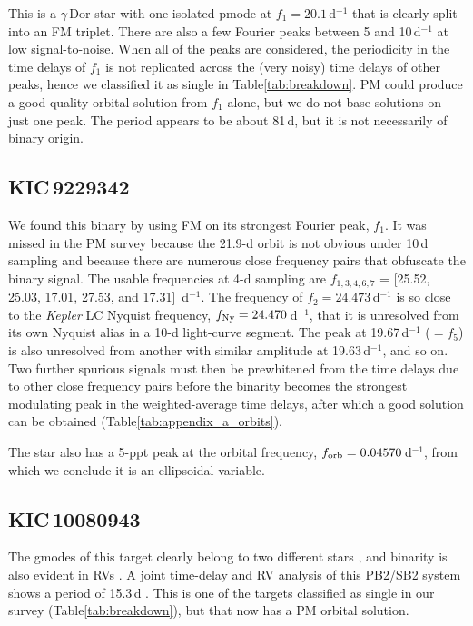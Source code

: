 \documentclass[a4paper,fleqn,usenatbib]{mnras}
\begin{document}
This is a $\gamma$\,Dor star with one isolated p\:mode at $f_1=20.1$\,d$^{-1}$ that is clearly split into an FM triplet. There are also a few Fourier peaks between 5 and 10\,d$^{-1}$ at low signal-to-noise. When all of the peaks are considered, the periodicity in the time delays of $f_1$ is not replicated across the (very noisy) time delays of other peaks, hence we classified it as single in Table\:\ref{tab:breakdown}. PM could produce a good quality orbital solution from $f_1$ alone, but we do not base solutions on just one peak. The period appears to be about 81\,d, but it is not necessarily of binary origin.


\subsection{KIC\,9229342} %

We found this binary by using FM on its strongest Fourier peak, $f_1$. It was missed in the PM survey because the 21.9-d orbit is not obvious under 10\,d sampling and because there are numerous close frequency pairs that obfuscate the binary signal. The usable frequencies at 4-d sampling are $f_{1,3,4,6,7}$ = [25.52, 25.03, 17.01, 27.53, and 17.31]~d$^{-1}$. The frequency of $f_2 = 24.473$\,d$^{-1}$ is so close to the \textit{Kepler} LC Nyquist frequency, $f_{\rm Ny} = 24.470$\,d$^{-1}$, that it is unresolved from its own Nyquist alias in a 10-d light-curve segment. The peak at 19.67\,d$^{-1}$ ($=f_5$) is also unresolved from another with similar amplitude at 19.63\,d$^{-1}$, and so on. Two further spurious signals must then be prewhitened from the time delays due to other close frequency pairs before the binarity becomes the strongest modulating peak in the weighted-average time delays, after which a good solution can be obtained (Table\:\ref{tab:appendix_a_orbits}).

The star also has a 5-ppt peak at the orbital frequency, $f_{\rm orb} = 0.04570$\,d$^{-1}$, from which we conclude it is an ellipsoidal variable.


\subsection{KIC\,10080943} %

The g\:modes of this target clearly belong to two different stars \citep{keenetal2015}, and binarity is also evident in RVs \citep{schmidetal2015}. A joint time-delay and RV analysis of this PB2/SB2 system shows a period of 15.3\,d \citep{murphyetal2016b}. This is one of the targets classified as single in our survey (Table\:\ref{tab:breakdown}), but that now has a PM orbital solution.
\end{document}
